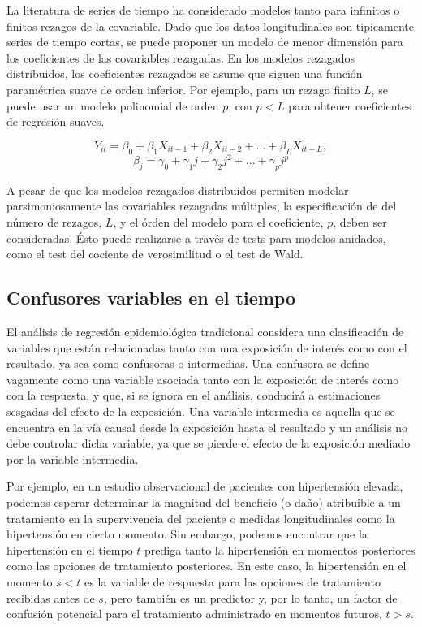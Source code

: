 \documentclass[spanish]{article}
\numberwithin{figure}{subsection}
\numberwithin{equation}{subsection}
\numberwithin{table}{subsection}
\begin{document}
La literatura de series de tiempo ha considerado modelos tanto para infinitos o
finitos rezagos de la covariable. Dado que los datos longitudinales son
tipicamente series de tiempo cortas, se puede proponer un modelo de menor
dimensión para los coeficientes de las covariables rezagadas. En los modelos
rezagados distribuidos, los coeficientes rezagados se asume que siguen una
función paramétrica suave de orden inferior. Por ejemplo, para un rezago finito
$L$, se puede usar un modelo polinomial de orden $p$, con $p < L$ para obtener
coeficientes de regresión suaves.

\[ Y_{it} = \beta_0 + \beta_1 X_{it-1} + \beta_2 X_{it-2} + ... +
\beta_L X_{it-L}, \]
\[ \beta_j = \gamma_0 + \gamma_1 j + \gamma_2 j^2 + ... + \gamma_p j^p \]

A pesar de que los modelos rezagados distribuidos permiten modelar
parsimoniosamente las covariables rezagadas múltiples, la especificación de del
número de rezagos, $L$, y el órden del modelo para el coeficiente, $p$, deben
ser consideradas. Ésto puede realizarse a través de tests para modelos
anidados, como el test del cociente de verosimilitud o el test de Wald.

\subsection{Confusores variables en el tiempo}

El análisis de regresión epidemiológica tradicional considera una clasificación
de variables que están relacionadas tanto con una exposición de interés como
con el resultado, ya sea como confusoras o intermedias. Una confusora se define
vagamente como una variable asociada tanto con la exposición de interés como
con la respuesta, y que, si se ignora en el análisis, conducirá a estimaciones
sesgadas del efecto de la exposición. Una variable intermedia es aquella que se
encuentra en la vía causal desde la exposición hasta el resultado y un análisis
no debe controlar dicha variable, ya que se pierde el efecto de la exposición
mediado por la variable intermedia.

Por ejemplo, en un estudio observacional de pacientes con hipertensión elevada,
podemos esperar determinar la magnitud del beneficio (o daño) atribuible a un
tratamiento en la supervivencia del paciente o medidas longitudinales como la
hipertensión en cierto momento. Sin embargo, podemos encontrar que la
hipertensión en el tiempo $t$ prediga tanto la hipertensión en momentos
posteriores como las opciones de tratamiento posteriores. En este caso, la
hipertensión en el momento $s < t$ es la variable de respuesta para las
opciones de tratamiento recibidas antes de $s$, pero también es un predictor y,
por lo tanto, un factor de confusión potencial para el tratamiento administrado
en momentos futuros, $t > s$.
\end{document}
